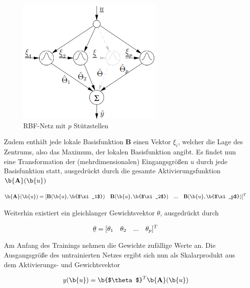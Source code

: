 \begin{figure} [H]
	\centering
	\includegraphics[width=0.65\textwidth]{images/rbf}
	\caption{RBF-Netz mit $p$ Stützstellen  \cite{Schroder.2010}}
	\label{fig:rbf}
\end{figure}


Zudem enthält jede lokale Basisfunktion $\textbf{B}$ einen Vektor \b{$\xi_i$}, welcher die Lage des Zentrums, also das Maximum, der lokalen Basisfunktion angibt. Es findet nun eine Transformation der (mehrdimensionalen) Eingangsgrößen \b{$u$} durch jede Basisfunktion statt, ausgedrückt durch die gesamte Aktivierungsfunktion $\b{\textbf{A}}(\b{u})$

\begin{equation}
\begin{aligned}
\b{\textbf{A}}(\b{u}) = [\textbf{B}(\b{u},\b{$\xi_1$}) \quad \textbf{B}(\b{u},\b{$\xi_2$}) \quad  ... \quad \textbf{B}(\b{u},\b{$\xi_p$})]^{T}
\end{aligned}
\end{equation}

Weiterhin existiert ein gleichlanger Gewichtsvektor \b{$\theta$}, ausgedrückt durch  

\begin{equation}
\begin{aligned}
\b{$\theta$} = [\theta_{1} \quad \theta_2 \quad ... \quad \theta_{p}]^{T}
\end{aligned}
\end{equation}

Am Anfang des Trainings nehmen die Gewichte zufällige Werte an. Die Ausgangsgröße des untrainierten Netzes ergibt sich nun als Skalarprodukt aus dem Aktivierungs- und Gewichtsvektor

\begin{equation}
\begin{aligned}
y(\b{u}) = \b{$\theta$}^T \b{\textbf{A}}(\b{u})
\end{aligned}
\end{equation}

